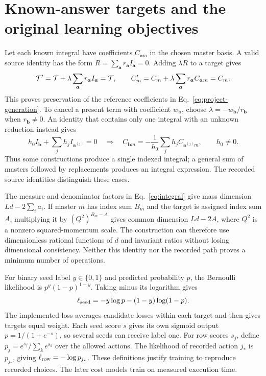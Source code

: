 \section{Known-answer targets and the original learning objectives}
\label{app:project-construction}
Let each known integral have coefficients $C_{\boldsymbol a m}$ in the chosen master basis. A valid source identity has the form $R=\sum_{\boldsymbol a}r_{\boldsymbol a}I_{\boldsymbol a}=0$. Adding $\lambda R$ to a target gives
\begin{equation}
 {\cal T}'={\cal T}+\lambda\sum_{\boldsymbol a}r_{\boldsymbol a}I_{\boldsymbol a}
 ={\cal T},\qquad
 C'_m=C_m+\lambda\sum_{\boldsymbol a}r_{\boldsymbol a}C_{\boldsymbol a m}=C_m.
\end{equation}
This proves preservation of the reference coefficients in Eq.~\eqref{eq:project-generation}. To cancel a present term with coefficient $w_{\boldsymbol b}$, choose $\lambda=-w_{\boldsymbol b}/r_{\boldsymbol b}$ when $r_{\boldsymbol b}\ne0$. An identity that contains only one integral with an unknown reduction instead gives
\begin{equation}
 h_0 I_{\boldsymbol b}+\sum_jh_jI_{\boldsymbol a^{(j)}}=0
 \quad\Longrightarrow\quad
 C_{\boldsymbol b m}=-\frac{1}{h_0}\sum_jh_jC_{\boldsymbol a^{(j)}m},
 \qquad h_0\ne0.
\end{equation}
Thus some constructions produce a single indexed integral; a general sum of masters followed by replacements produces an integral expression. The recorded source identities distinguish these cases.

The measure and denominator factors in Eq.~\eqref{eq:integral} give mass dimension $Ld-2\sum_i a_i$. If master $m$ has index sum $B_m$ and the target is assigned index sum $A$, multiplying it by $(Q^2)^{B_m-A}$ gives common dimension $Ld-2A$, where $Q^2$ is a nonzero squared-momentum scale. The construction can therefore use dimensionless rational functions of $d$ and invariant ratios without losing dimensional consistency. Neither this identity nor the recorded path proves a minimum number of operations.

For binary seed label $y\in\{0,1\}$ and predicted probability $p$, the Bernoulli likelihood is $p^y(1-p)^{1-y}$. Taking minus its logarithm gives
\begin{equation}
 \ell_{\rm seed}=-y\log p-(1-y)\log(1-p).
\end{equation}
The implemented loss averages candidate losses within each target and then gives targets equal weight. Each seed score $s$ gives its own sigmoid output $p=1/(1+e^{-s})$, so several seeds can receive label one. For row scores $s_j$, define $p_j=e^{s_j}/\sum_k e^{s_k}$ over the allowed actions. The likelihood of recorded action $j_*$ is $p_{j_*}$, giving $\ell_{\rm row}=-\log p_{j_*}$. These definitions justify training to reproduce recorded choices. The later cost models train on measured execution time.

